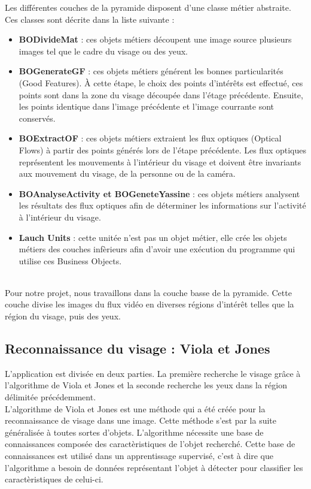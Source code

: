 Les différentes couches de la pyramide disposent d'une classe métier abstraite. Ces classes 
sont décrite dans la liste suivante :\\

\begin{itemize}
 \item \textbf{BODivideMat} : ces objets métiers découpent une image source plusieurs images tel que 
 le cadre du visage ou des yeux.
 \item \textbf{BOGenerateGF} : ces objets métiers générent les bonnes particularités (Good Features). 
 À cette étape, le choix des points d'intérêts est effectué, ces points sont dans la zone du visage 
 découpée dans l'étage précédente. Ensuite, les points identique dans l'image précédente et l'image 
 courrante sont conservés.
 \item \textbf{BOExtractOF} : ces objets métiers extraient les flux optiques (Optical Flows) à partir 
 des points générés lors de l'étape précédente. Les flux optiques représentent les mouvements à l'intérieur 
 du visage et doivent être invariants aux mouvement du visage, de la personne ou de la caméra.
 \item \textbf{BOAnalyseActivity et BOGeneteYassine} : ces objets métiers analysent les résultats 
 des flux optiques afin de déterminer les informations sur l'activité à l'intérieur du visage.
 \item \textbf{Lauch Units} : cette unitée n'est pas un objet métier, elle crée les objets métiers des 
 couches infèrieurs afin d'avoir une exécution du programme qui utilise ces Business Objects.
\end{itemize}
\ \\

Pour notre projet, nous travaillons dans la couche basse de la pyramide. Cette couche divise
les images du flux vidéo en diverses régions d'intérêt telles que la région du visage, puis 
des yeux.

\subsection{Reconnaissance du visage : Viola et Jones}
L'application est divisée en deux parties. La première recherche le visage grâce à
l'algorithme de Viola et Jones et la seconde recherche les yeux dans la région délimitée
précédemment.\\

L'algorithme de Viola et Jones\cite{Viola04robustreal-time} est une méthode qui a été créée pour la reconnaissance de visage dans une 
image. Cette méthode s'est par la suite généralisée à toutes sortes d'objets. L'algorithme nécessite une 
base de connaissances composée des caractèristiques de l'objet recherché. Cette base de connaissances est utilisé dans un 
apprentissage supervisé, c'est à dire que l'algorithme a besoin de données représentant
l'objet à détecter pour classifier les caractèristiques de celui-ci.\\

